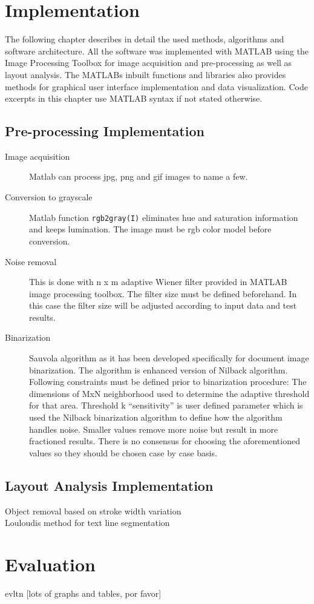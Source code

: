 \documentclass{article}
\def\code#1{\texttt{#1}}
\begin{document}
  \newpage
  \section{Implementation}
    The following chapter describes in detail the used methods, algorithms and software architecture. All the software was implemented with MATLAB using the Image Processing Toolbox for image acquisition and pre-processing as well as layout analysis.\cite{TheMathWorksa} The MATLABs inbuilt functions and libraries also provides methods for graphical user interface implementation and data visualization. Code excerpts in this chapter use MATLAB syntax if not stated otherwise.

    \subsection{Pre-processing Implementation}
      \begin{description}
        \item [Image acquisition] Matlab can process jpg, png and gif images to name a few.
        \item [Conversion to grayscale] Matlab function \code{rgb2gray(I)} eliminates hue and saturation information and keeps lumination. The image must be rgb color model before conversion.
        \item [Noise removal] This is done with n x m adaptive Wiener filter provided in MATLAB image processing toolbox. The filter size must be defined beforehand. In this case the filter size will be adjusted according to input data and test results.
        \item [Binarization] Sauvola algorithm as it has been developed specifically for document image binarization. The algorithm is enhanced version of Nilback algorithm. \cite{Sauvola2000}
        Following  constraints must be defined prior to binarization procedure: The dimensions of MxN neighborhood used to determine the adaptive threshold for that area. Threshold k ``sensitivity'' is user defined parameter which is used the Nilback binarization algorithm to define how the algorithm handles noise. Smaller values remove more noise but result in more fractioned results. There is no consensus for choosing the aforementioned values so they should be chosen case by case basis.
      \end{description}

      \subsection{Layout Analysis Implementation}
        \begin{description}
          \item [Object removal based on stroke width variation]
          \item [Louloudis method for text line segmentation]
        \end{description}
  \newpage
  \section{Evaluation}
  evltn [lots of graphs and tables, por favor]

  \newpage
  
  
\end{document}
